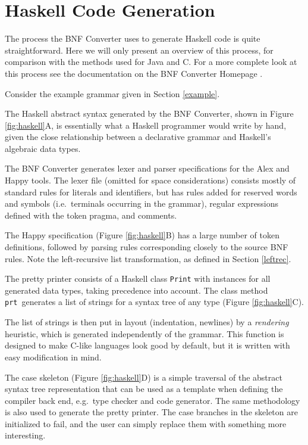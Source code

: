 \section{Haskell Code Generation}

The process the BNF Converter uses to generate Haskell code is quite straightforward. Here we will only present an overview of this process, for comparison with the methods used for Java and C. For a more complete look at this process see the documentation on the BNF Converter Homepage \cite{bnfcsite}.


Consider the example grammar given in Section \ref{example}.

The Haskell abstract syntax generated by the
BNF Converter, shown in Figure \ref{fig:haskell}A, is essentially what a Haskell programmer would write by hand, given the close relationship between a declarative grammar and Haskell's algebraic data types.


The BNF Converter generates lexer and parser specifications for the Alex \cite{alex} and Happy \cite{happy} tools. The lexer file (omitted for space considerations) consists mostly of standard rules for literals and identifiers, but has
rules added for reserved words and symbols (i.e.\ terminals 
occurring in the grammar), regular expressions defined with the token pragma, and comments. 

The Happy specification (Figure \ref{fig:haskell}B) has a large number of token definitions,
followed by parsing rules corresponding closely to the source BNF rules. Note the left-recursive list transformation, as defined in Section \ref{leftrec}.


The pretty printer consists of a Haskell class {\tt Print} with instances
for all generated data types, taking precedence into account. The class method
{\tt prt}\
generates a list of strings for a syntax tree of any type (Figure \ref{fig:haskell}C).

The list of strings is then put in layout (indentation, newlines) by a \textit{rendering}
heuristic, which is generated independently of the grammar. This function is designed to make C-like languages look good by default, but it is written with easy modification in mind.

The case skeleton (Figure \ref{fig:haskell}D) is a simple traversal of the abstract syntax tree representation that can be used as a template when defining the compiler
back end, e.g.\ type checker and code generator. The same methodology is
also used to generate the pretty printer. The case branches in the skeleton
are initialized to fail, and the user can simply replace them with something more interesting.

